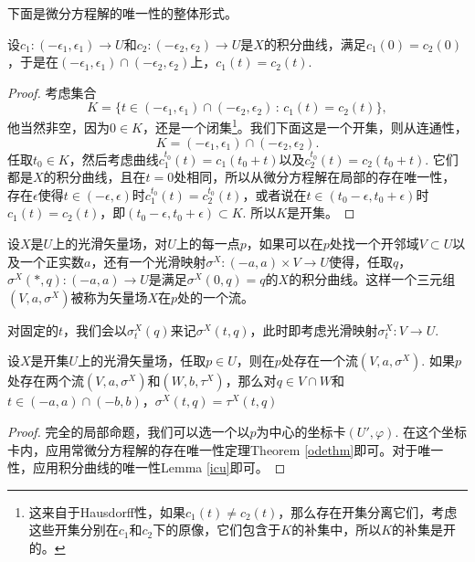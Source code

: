下面是微分方程解的唯一性的整体形式。

\begin{lem}[积分曲线的唯一性]\label{icu}
设$c_1:(-\epsilon_1,\epsilon_1)\to U$和$c_2:(-\epsilon_2,\epsilon_2)\to U$是$X$的积分曲线，满足$c_1(0)=c_2(0)$，于是在$(-\epsilon_1,\epsilon_1)\cap (-\epsilon_2,\epsilon_2)$上，$c_1(t)=c_2(t)$.
\end{lem}

\begin{proof}
考虑集合
\[
	K=\{t\in (-\epsilon_1,\epsilon_1)\cap (-\epsilon_2,\epsilon_2)\,:\,c_1(t)=c_2(t)\},
\]
他当然非空，因为$0\in K$，还是一个闭集\footnote{这来自于Hausdorff性，如果$c_1(t)\neq c_2(t)$，那么存在开集分离它们，考虑这些开集分别在$c_1$和$c_2$下的原像，它们包含于$K$的补集中，所以$K$的补集是开的。}。我们下面这是一个开集，则从连通性，
\[
	K=(-\epsilon_1,\epsilon_1)\cap (-\epsilon_2,\epsilon_2).
\]
任取$t_0\in K$，然后考虑曲线$c_1^{t_0}(t)=c_1(t_0+t)$以及$c_2^{t_0}(t)=c_2(t_0+t)$. 它们都是$X$的积分曲线，且在$t=0$处相同，所以从微分方程解在局部的存在唯一性，存在$\epsilon$使得$t\in (-\epsilon,\epsilon)$时$c_1^{t_0}(t)=c_2^{t_0}(t)$，或者说在$t\in (t_0-\epsilon,t_0+\epsilon)$时$c_1(t)=c_2(t)$，即$(t_0-\epsilon,t_0+\epsilon)\subset K$. 所以$K$是开集。
\end{proof}

\begin{para}[矢量场的流]
设$X$是$U$上的光滑矢量场，对$U$上的每一点$p$，如果可以在$p$处找一个开邻域$V\subset U$以及一个正实数$a$，还有一个光滑映射$\sigma^X:(-a,a)\times V\to U$使得，任取$q$，$\sigma^X(*,q):(-a,a)\to U$是满足$\sigma^X(0,q)=q$的$X$的积分曲线。这样一个三元组$(V,a,\sigma^X)$被称为矢量场$X$在$p$处的一个流。

对固定的$t$，我们会以$\sigma^X_t(q)$来记$\sigma^X(t,q)$，此时即考虑光滑映射$\sigma^X_t:V\to U$.
\end{para}

\begin{thm}[局部流的存在唯一性]
设$X$是开集$U$上的光滑矢量场，任取$p\in U$，则在$p$处存在一个流$(V,a,\sigma^X)$. 如果$p$处存在两个流$(V,a,\sigma^X)$和$(W,b,\tau^X)$，那么对$q\in V\cap W$和$t\in (-a,a)\cap (-b,b)$，$\sigma^X(t,q)=\tau^X(t,q)$
\end{thm}

\begin{proof}
完全的局部命题，我们可以选一个以$p$为中心的坐标卡$(U',\varphi)$. 在这个坐标卡内，应用常微分方程解的存在唯一性定理Theorem \ref{odethm}即可。对于唯一性，应用积分曲线的唯一性Lemma \ref{icu}即可。
\end{proof}

